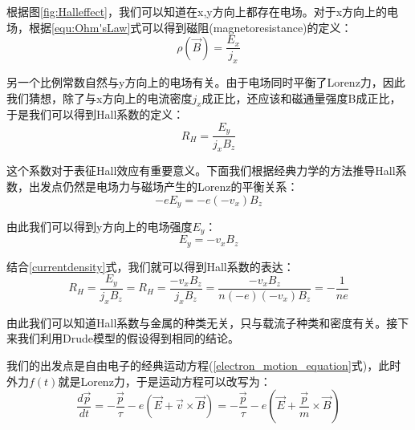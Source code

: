 \documentclass{ctexart}
\begin{document}
                根据图\ref{fig:Halleffect}，我们可以知道在x,y方向上都存在电场。对于x方向上的电场，根据\eqref{equ:Ohm'sLaw}式可以得到磁阻(magnetoresistance)的定义：
                \begin{equation}
                    \rho(\vec{B})=\frac{E_x}{j_x}
                \end{equation}
                
                另一个比例常数自然与y方向上的电场有关。由于电场同时平衡了Lorenz力，因此我们猜想，除了与x方向上的电流密度$j_x$成正比，还应该和磁通量强度B成正比，于是我们可以得到Hall系数的定义：
                \begin{equation}
                    R_H=\frac{E_y}{j_xB_z}
                \end{equation}
                
                这个系数对于表征Hall效应有重要意义。下面我们根据经典力学的方法推导Hall系数，出发点仍然是电场力与磁场产生的Lorenz的平衡关系：
                \begin{equation}
                    -eE_y=-e(-v_x)B_z
                \end{equation}
                
                由此我们可以得到y方向上的电场强度$E_y$：
                \begin{equation}
                    E_y=-v_xB_z
                \end{equation}
                
                结合\eqref{currentdensity}式，我们就可以得到Hall系数的表达：
                \begin{equation}
                    R_H=\frac{E_y}{j_xB_z}=R_H=\frac{-v_xB_z}{j_xB_z}=\frac{-v_xB_z}{n(-e)(-v_x)B_z}=-\frac{1}{ne}
                \end{equation}
                
                由此我们可以知道Hall系数与金属的种类无关，只与载流子种类和密度有关。接下来我们利用Drude模型的假设得到相同的结论。
                
                我们的出发点是自由电子的经典运动方程(\eqref{electron_motion_equation}式)，此时外力$f(t)$就是Lorenz力，于是运动方程可以改写为：
                \begin{equation}
                    \frac{d\vec{p}}{dt}=-\frac{\vec{p}}{\tau}-e(\vec{E}+\vec{v}\times \vec{B})=-\frac{\vec{p}}{\tau}-e(\vec{E}+\frac{\vec{p}}{m}\times \vec{B})
                \end{equation}
                
\end{document}
